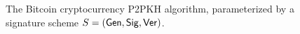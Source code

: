 \begin{figure}[t]
\begin{algorithm}[H]
    \caption{\label{alg.bitcoin} The Bitcoin cryptocurrency P2PKH algorithm,
    parameterized by a signature scheme $S = (\mathsf{Gen}, \mathsf{Sig}, \mathsf{Ver})$.}
    \begin{algorithmic}[1]
            \State{}
        \EndFunction
            \State{}
        \EndFunction
        \vskip8pt
    \end{algorithmic}
\end{algorithm}
\end{figure}
